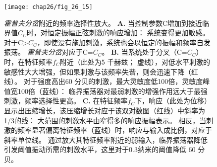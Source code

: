 \begin{figure}[htbp]
	\centering
	\texttt{[image: chap26/fig\_26\_15]}
	\caption{\textit{霍普夫分岔}附近的频率选择性放大。
		\textbf{A.} 当控制参数C增加到接近临界值$C_C$时，对恒定振幅正弦刺激的响应增加：
		系统变得更加敏感。
		对于C>$C_C$，即使没有施加刺激，系统也会以恒定的振幅和频率自发振荡。
		\textit{霍普夫分岔}对应于C=$C_C$。
		\textbf{B.} 当系统处于分叉（C=$C_C$）时，在特征频率$f_C$附近（此处为5 千赫兹；
		虚线），对低水平刺激的敏感性大大增强，但如果刺激与该频率失谐，则会迅速下降（红线）。
		对于强度高出60 分贝的刺激，最大灵敏度低100倍，灵敏度峰值宽100倍（蓝线）：
		临界振荡器对最弱刺激的增强作用远大于最强刺激，频率选择性更高。
		\textbf{C.} 在特征频率$f_C$下，响应（此处为位移）显示出压缩增长，该压缩增长对应于该双对数图（红线）中斜率为1/3的线：
		大范围的刺激水平由窄得多的响应振幅表示。
		相反，当刺激的频率显著偏离特征频率（蓝线）时，响应与输入成比例，对应于斜率单位线。
		通过放大其特征频率附近的弱输入，临界振荡器降低引发阈值振动所需的刺激水平，这里对于0.3纳米的阈值降低 60 分贝。}
	\label{fig:26_15}
\end{figure}


